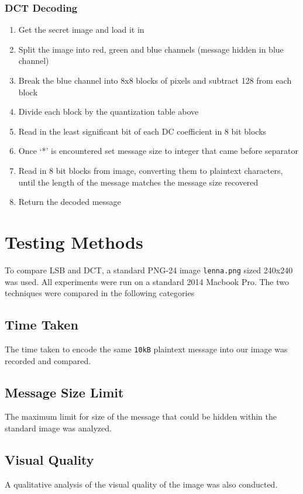\documentclass[11pt,letterpaper]{article}
\begin{document}
\subsubsection{DCT Decoding}
\begin{enumerate}
\setlength\itemsep{0pt}
\item Get the secret image and load it in
\item Split the image into red, green and blue channels (message hidden in blue channel)
\item Break the blue channel into 8x8 blocks of pixels and subtract 128 from each block
\item Divide each block by the quantization table above
\item Read in the least significant bit of each DC coefficient in 8 bit blocks
\item Once ‘*’ is encountered set message size to integer that came before separator
\item Read in 8 bit blocks from image, converting them to plaintext characters, until the length of the message matches the message size recovered
\item Return the decoded message
\end{enumerate}

\section{Testing Methods}
To compare LSB and DCT, a standard PNG-24 image \texttt{lenna.png} sized 240x240 was used. All experiments were run on a standard 2014 Macbook Pro. The two techniques were compared in the following categories
\subsection{Time Taken}
The time taken to encode the same \texttt{10kB} plaintext message into our image was recorded and compared.

\subsection{Message Size Limit}
The maximum limit for size of the message that could be hidden within the standard image was analyzed.

\subsection{Visual Quality}
A qualitative analysis of the visual quality of the image was also conducted. 
\end{document}
